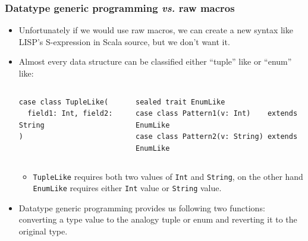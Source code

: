 \begin{frame}[fragile]
  \frametitle{Datatype generic programming \textit{vs.} raw macros}

  \pause
  \begin{itemize}
    \item<+-> Unfortunately if we would use raw macros, we can create a new syntax like LISP's S-expression in Scala source,
    but we don't want it.

    \item<+-> Almost every data structure can be classified either ``tuple'' like or ``enum'' like:
    \begin{columns}
      \begin{column}{0.32\textwidth}
\begin{lstlisting}[style=scala]
case class TupleLike(
  field1: Int, field2: String
)
\end{lstlisting}
      \end{column}
      \begin{column}{0.5\textwidth}
\begin{lstlisting}[style=scala]
sealed trait EnumLike
case class Pattern1(v: Int)    extends EnumLike
case class Pattern2(v: String) extends EnumLike
\end{lstlisting}
      \end{column}
    \end{columns}
    \begin{itemize}
      \item \lstinline|TupleLike| requires both two values of \lstinline|Int| and \lstinline|String|,
      on the other hand \lstinline|EnumLike| requires either \lstinline|Int| value or \lstinline|String| value.
    \end{itemize}

    \item<+-> Datatype generic programming provides us following two functions: 
       converting a type value to the analogy tuple or enum and
       reverting it to the original type.
  \end{itemize}

\end{frame}
